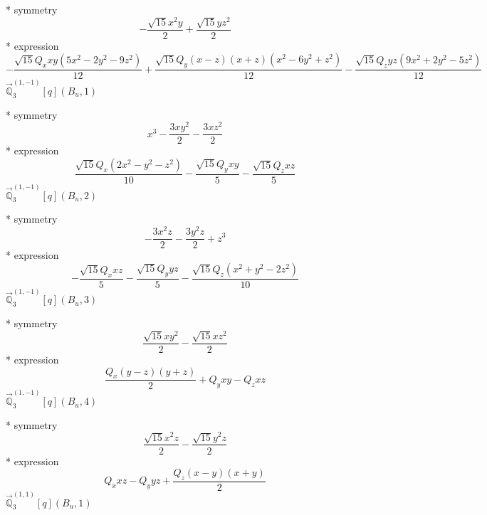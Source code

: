 \documentclass[fleqn,8pt]{jsarticle}
\begin{document}
\noindent\quad ** symmetry
\begin{dmath*}
- \frac{\sqrt{15} x^{2} y}{2} + \frac{\sqrt{15} y z^{2}}{2}
\end{dmath*}
\noindent\quad ** expression
\begin{dmath*}
- \frac{\sqrt{15} Q_{x} x y \left(5 x^{2} - 2 y^{2} - 9 z^{2}\right)}{12} + \frac{\sqrt{15} Q_{y} \left(x - z\right) \left(x + z\right) \left(x^{2} - 6 y^{2} + z^{2}\right)}{12} - \frac{\sqrt{15} Q_{z} y z \left(9 x^{2} + 2 y^{2} - 5 z^{2}\right)}{12}
\end{dmath*}
\noindent\quad $\vec{\mathbb{Q}}_{3}^{(1,-1)}[q](B_{u},1)$

\noindent\quad ** symmetry
\begin{dmath*}
x^{3} - \frac{3 x y^{2}}{2} - \frac{3 x z^{2}}{2}
\end{dmath*}
\noindent\quad ** expression
\begin{dmath*}
\frac{\sqrt{15} Q_{x} \left(2 x^{2} - y^{2} - z^{2}\right)}{10} - \frac{\sqrt{15} Q_{y} x y}{5} - \frac{\sqrt{15} Q_{z} x z}{5}
\end{dmath*}
\noindent\quad $\vec{\mathbb{Q}}_{3}^{(1,-1)}[q](B_{u},2)$

\noindent\quad ** symmetry
\begin{dmath*}
- \frac{3 x^{2} z}{2} - \frac{3 y^{2} z}{2} + z^{3}
\end{dmath*}
\noindent\quad ** expression
\begin{dmath*}
- \frac{\sqrt{15} Q_{x} x z}{5} - \frac{\sqrt{15} Q_{y} y z}{5} - \frac{\sqrt{15} Q_{z} \left(x^{2} + y^{2} - 2 z^{2}\right)}{10}
\end{dmath*}
\noindent\quad $\vec{\mathbb{Q}}_{3}^{(1,-1)}[q](B_{u},3)$

\noindent\quad ** symmetry
\begin{dmath*}
\frac{\sqrt{15} x y^{2}}{2} - \frac{\sqrt{15} x z^{2}}{2}
\end{dmath*}
\noindent\quad ** expression
\begin{dmath*}
\frac{Q_{x} \left(y - z\right) \left(y + z\right)}{2} + Q_{y} x y - Q_{z} x z
\end{dmath*}
\noindent\quad $\vec{\mathbb{Q}}_{3}^{(1,-1)}[q](B_{u},4)$

\noindent\quad ** symmetry
\begin{dmath*}
\frac{\sqrt{15} x^{2} z}{2} - \frac{\sqrt{15} y^{2} z}{2}
\end{dmath*}
\noindent\quad ** expression
\begin{dmath*}
Q_{x} x z - Q_{y} y z + \frac{Q_{z} \left(x - y\right) \left(x + y\right)}{2}
\end{dmath*}
\noindent\quad $\vec{\mathbb{Q}}_{3}^{(1,1)}[q](B_{u},1)$
\end{document}
